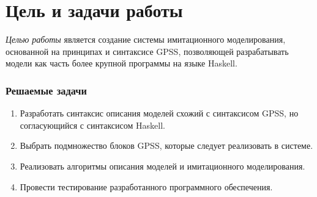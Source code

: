 \documentclass[12pt]{article}
\begin{document}

\TitleSlide


\section{Цель и задачи работы}
\small
\emph{Целью работы} является создание системы имитационного
моделирования, основанной на принципах и синтаксисе GPSS, позволяющей разрабатывать модели как часть более крупной программы на языке Haskell.

\subsubsection{Решаемые задачи}
\begin{enumerate}
\item Разработать синтаксис описания моделей схожий с синтаксисом
GPSS, но согласующийся с синтаксисом Haskell.
\item Выбрать подмножество блоков GPSS, которые следует реализовать
в системе.
\item Реализовать алгоритмы описания моделей и имитационного моделирования.
\item Провести тестирование разработанного программного обеспечения.
\end{enumerate}

\normalsize

\end{document}
